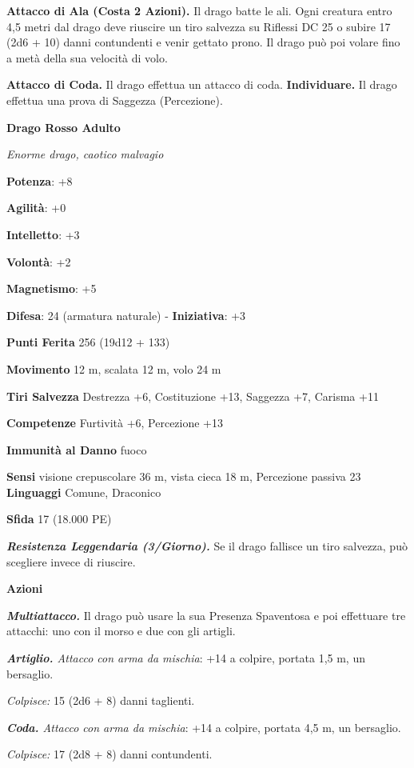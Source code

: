 \begin{multicols}{2}
\textbf{Attacco di Ala (Costa 2 Azioni).} Il drago batte le ali. Ogni
creatura entro 4,5 metri dal drago deve riuscire un tiro salvezza su Riflessi DC 25 o subire 17 (2d6 + 10) danni contundenti e venir gettato
prono. Il drago può poi volare fino a metà della sua velocità di volo.

\textbf{Attacco di Coda.} Il drago effettua un attacco di coda.
\textbf{Individuare.} Il drago effettua una prova di Saggezza
(Percezione).

\textbf{Drago Rosso Adulto}

\emph{Enorme drago, caotico malvagio}

\textbf{Potenza}: +8

\textbf{Agilità}: +0

\textbf{Intelletto}: +3

\textbf{Volontà}: +2

\textbf{Magnetismo}: +5

\textbf{Difesa}: 24 (armatura naturale) - \textbf{Iniziativa}: +3

\textbf{Punti Ferita} 256 (19d12 + 133)

\textbf{Movimento} 12 m, scalata 12 m, volo 24 m

\textbf{Tiri Salvezza} Destrezza +6, Costituzione +13, Saggezza +7,
Carisma +11

\textbf{Competenze} Furtività +6, Percezione +13

\textbf{Immunità al Danno} fuoco

\textbf{Sensi} visione crepuscolare 36 m, vista cieca 18 m, Percezione passiva
23 \textbf{Linguaggi} Comune, Draconico

\textbf{Sfida} 17 (18.000 PE)

\emph{\textbf{Resistenza Leggendaria (3/Giorno).}} Se il drago fallisce
un tiro salvezza, può scegliere invece di riuscire.

\textbf{Azioni}

\emph{\textbf{Multiattacco.}} Il drago può usare la sua Presenza
Spaventosa e poi effettuare tre attacchi: uno con il morso e due con gli
artigli.

\emph{\textbf{Artiglio.} Attacco con arma da mischia}: +14 a colpire,
portata 1,5 m, un bersaglio.

\emph{Colpisce:} 15 (2d6 + 8) danni taglienti.

\emph{\textbf{Coda.} Attacco con arma da mischia}: +14 a colpire,
portata 4,5 m, un bersaglio.

\emph{Colpisce:} 17 (2d8 + 8) danni contundenti.


\end{multicols}
